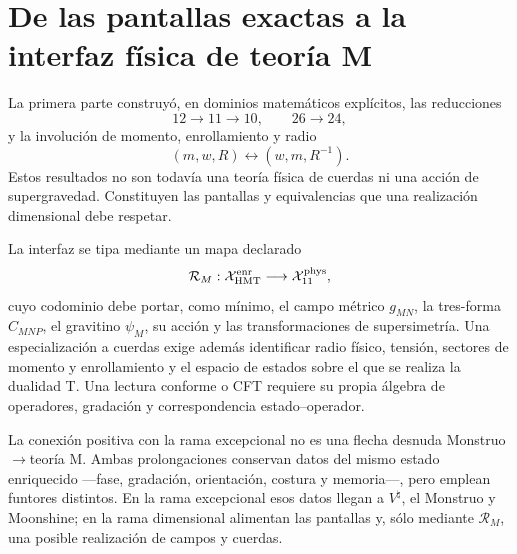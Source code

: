 \section{De las pantallas exactas a la interfaz física de teoría M}
\label{sec:interfaz-teoria-m-rev8}

La primera parte construyó, en dominios matemáticos explícitos, las
reducciones
\[
12\longrightarrow11\longrightarrow10,
\qquad
26\longrightarrow24,
\]
y la involución de momento, enrollamiento y radio
\[
(m,w,R)\longleftrightarrow(w,m,R^{-1}).
\]
Estos resultados no son todavía una teoría física de cuerdas ni una acción
de supergravedad. Constituyen las pantallas y equivalencias que una
realización dimensional debe respetar.

La interfaz se tipa mediante un mapa declarado
\[
\mathcal R_M:\mathcal X_{\rm HMT}^{\rm enr}
\longrightarrow
\mathcal X_{11}^{\rm phys},
\]
cuyo codominio debe portar, como mínimo, el campo métrico \(g_{MN}\), la
tres-forma \(C_{MNP}\), el gravitino \(\psi_M\), su acción y las
transformaciones de supersimetría. Una especialización a cuerdas exige
además identificar radio físico, tensión, sectores de momento y
enrollamiento y el espacio de estados sobre el que se realiza la dualidad
T. Una lectura conforme o CFT requiere su propia álgebra de operadores,
gradación y correspondencia estado--operador.

La conexión positiva con la rama excepcional no es una flecha desnuda
Monstruo\(\to\)teoría M. Ambas prolongaciones conservan datos del mismo
estado enriquecido ---fase, gradación, orientación, costura y memoria---,
pero emplean funtores distintos. En la rama excepcional esos datos llegan a
\(V^\natural\), el Monstruo y Moonshine; en la rama dimensional alimentan
las pantallas y, sólo mediante \(\mathcal R_M\), una posible realización de
campos y cuerdas.

